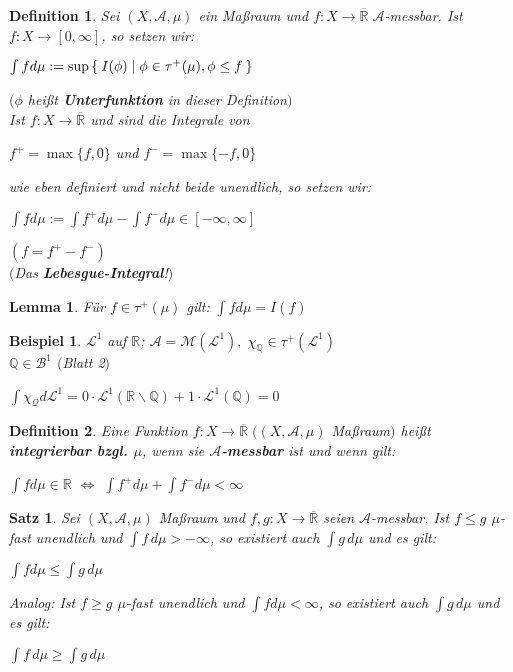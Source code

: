 \documentclass[11pt]{memoir}
\theoremstyle{changebreak}
\newtheorem{Definition}{Definition}[chapter]
\newtheorem{Beispiel}{Beispiel}[chapter]
\newtheorem{Lemma}{Lemma}[chapter]
\newtheorem{Satz}{Satz}[chapter]
\begin{document}
\begin{Definition}
Sei $(X, \mathscr A, \mu)$ ein Maßraum und $f: X \rightarrow \overline{\mathbb R}\; \mathscr A$-messbar. Ist $f: X \rightarrow [0, \infty]$, so setzen wir:
\begin{center}
	$\int f d\mu := \sup\Set{I(\phi) | \phi \in \tau^+(\mu), \phi \leq f}$ 
\end{center}
$(\phi$ heißt \textbf{Unterfunktion} in dieser Definition$)$ \\

Ist $f: X \rightarrow \overline{\mathbb R}$ und sind die Integrale von
\begin{center}
	$f^+ = \max \{f, 0\}$ und $f^- = \max\{-f, 0\}$ 
\end{center}
wie eben definiert und nicht beide unendlich, so setzen wir: 
\begin{center}
	$\int f d\mu := \int f^+ d\mu - \int f^- d\mu \in [-\infty, \infty]$ 
\end{center}
$(f = f^+ - f^-)$ \\
$($Das \textbf{Lebesgue-Integral}!$)$
\end{Definition}

\begin{Lemma}
Für $f \in \tau^+ (\mu)$ gilt: $\int f d\mu = I(f)$
\end{Lemma}

\begin{Beispiel}
$\mathscr L^1$ auf $\mathbb R$; $\mathscr A = \mathscr M(\mathscr L^1), \;\chi_\mathbb Q \in \tau^+ (\mathscr L^1)$ \\
$\mathbb Q \in \mathscr B^1$ $($Blatt 2$)$ 
\begin{center}
	$\int \chi_\mathscr Q d\mathscr L^1 = 0 \cdotp \mathscr L^1(\mathbb R \backslash \mathbb Q) + 1 \cdotp \mathscr L^1(\mathbb Q) = 0$
\end{center}
\end{Beispiel}

\begin{Definition}
Eine Funktion $f: X \rightarrow \overline{\mathbb R} \;((X, \mathscr A, \mu)$ Maßraum$)$ heißt \textbf{integrierbar bzgl. $\mu$}, wenn sie \textbf{$\mathscr A$-messbar} ist und wenn gilt: 
\begin{center}
	$\int f d\mu \in \mathbb R$ $\Leftrightarrow$ $\int f^+ d\mu + \int f^- d\mu < \infty$
\end{center}
\end{Definition}

\begin{Satz}
Sei $(X, \mathscr A, \mu)$ Maßraum und $f, g: X \rightarrow \overline{\mathbb R}$ seien $\mathscr A$-messbar. Ist $f \leq g$ $\mu$-fast unendlich und $\int f \, d\mu > -\infty$, so existiert auch $\int g \,d\mu$ und es gilt: 
\begin{center}
	$\int f d\mu \leq \int g \,d\mu$ 
\end{center}
Analog:  Ist $f \geq g$ $\mu$-fast unendlich und $\int f d\mu < \infty$, so existiert auch $\int g \,d\mu$ und es gilt: 
\begin{center}
	$\int f \,d\mu \geq \int g \,d\mu$
\end{center}
\end{Satz}
\end{document}
